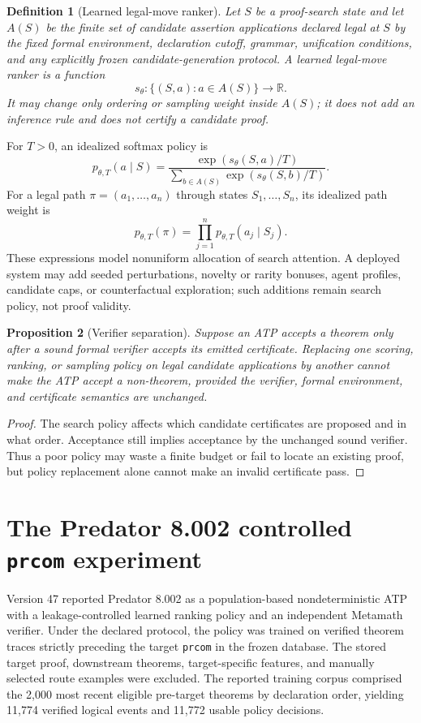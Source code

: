 \documentclass[11pt]{article}
\newtheorem{definition}{Definition}[section]
\newtheorem{proposition}[definition]{Proposition}
\theoremstyle{remark}
\begin{document}
\begin{definition}[Learned legal-move ranker]
Let $S$ be a proof-search state and let $A(S)$ be the finite set of candidate assertion applications declared legal at $S$ by the fixed formal environment, declaration cutoff, grammar, unification conditions, and any explicitly frozen candidate-generation protocol. A learned legal-move ranker is a function
\[
s_\theta:\{(S,a):a\in A(S)\}\to\mathbb R.
\]
It may change only ordering or sampling weight inside $A(S)$; it does not add an inference rule and does not certify a candidate proof.
\end{definition}

For $T>0$, an idealized softmax policy is
\[
p_{\theta,T}(a\mid S)
=
\frac{\exp(s_\theta(S,a)/T)}
{\sum_{b\in A(S)}\exp(s_\theta(S,b)/T)}.
\]
For a legal path $\pi=(a_1,\ldots,a_n)$ through states $S_1,\ldots,S_n$, its idealized path weight is
\[
p_{\theta,T}(\pi)=\prod_{j=1}^{n}p_{\theta,T}(a_j\mid S_j).
\]
These expressions model nonuniform allocation of search attention. A deployed system may add seeded perturbations, novelty or rarity bonuses, agent profiles, candidate caps, or counterfactual exploration; such additions remain search policy, not proof validity.

\begin{proposition}[Verifier separation]
Suppose an ATP accepts a theorem only after a sound formal verifier accepts its emitted certificate. Replacing one scoring, ranking, or sampling policy on legal candidate applications by another cannot make the ATP accept a non-theorem, provided the verifier, formal environment, and certificate semantics are unchanged.
\end{proposition}
\begin{proof}
The search policy affects which candidate certificates are proposed and in what order. Acceptance still implies acceptance by the unchanged sound verifier. Thus a poor policy may waste a finite budget or fail to locate an existing proof, but policy replacement alone cannot make an invalid certificate pass.
\end{proof}

\section{The Predator 8.002 controlled \texttt{prcom} experiment}
Version 47 reported Predator 8.002 as a population-based nondeterministic ATP with a leakage-controlled learned ranking policy and an independent Metamath verifier. Under the declared protocol, the policy was trained on verified theorem traces strictly preceding the target \texttt{prcom} in the frozen database. The stored target proof, downstream theorems, target-specific features, and manually selected route examples were excluded. The reported training corpus comprised the 2,000 most recent eligible pre-target theorems by declaration order, yielding 11,774 verified logical events and 11,772 usable policy decisions.
\end{document}
